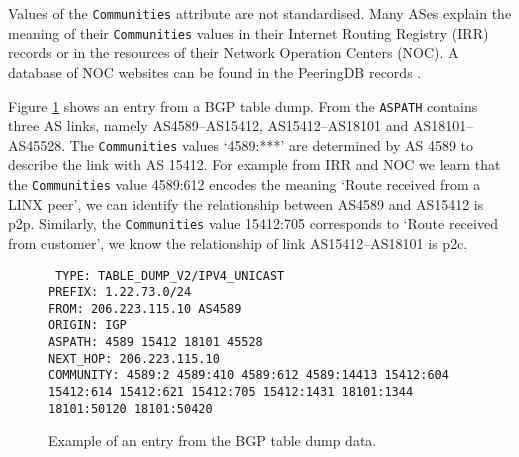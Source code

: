 \documentclass[conference]{IEEEtran}
\begin{document}
Values of the {\tt Communities} attribute are not standardised. Many ASes explain the meaning of their {\tt Communities} values in their Internet Routing Registry (IRR) records \cite{irr} or in the resources of their Network Operation Centers (NOC). A database of NOC websites can be found in the PeeringDB records \cite{PeeringDB}. 

Figure \ref{fig:communities} shows an entry from a BGP table dump. From the {\tt ASPATH} contains three AS links, namely AS4589--AS15412, AS15412--AS18101 and AS18101--AS45528. The  {\tt Communities} values `4589:***' are determined by AS 4589 to describe the  link with AS 15412. For example from  IRR and NOC we  learn that the {\tt Communities} value 4589:612 encodes the meaning `Route received from a LINX peer',  we can identify the relationship between AS4589 and AS15412 is p2p. Similarly, the {\tt Communities} value 15412:705 corresponds to `Route received from customer', we know the relationship of link AS15412--AS18101 is p2c.


\begin{figure}
{
{\tt
TYPE: TABLE\_DUMP\_V2/IPV4\_UNICAST\\
PREFIX: 1.22.73.0/24\\
FROM: 206.223.115.10 AS4589\\
ORIGIN: IGP\\
ASPATH: 4589 15412 18101 45528\\
NEXT\_HOP: 206.223.115.10\\
COMMUNITY: 4589:2 4589:410 4589:612 4589:14413 15412:604 15412:614 15412:621 15412:705 15412:1431 18101:1344 18101:50120 18101:50420\\
}
}
\caption{Example of an entry from the BGP table dump data. }
\label{fig:communities}
\end{figure}
\end{document}
